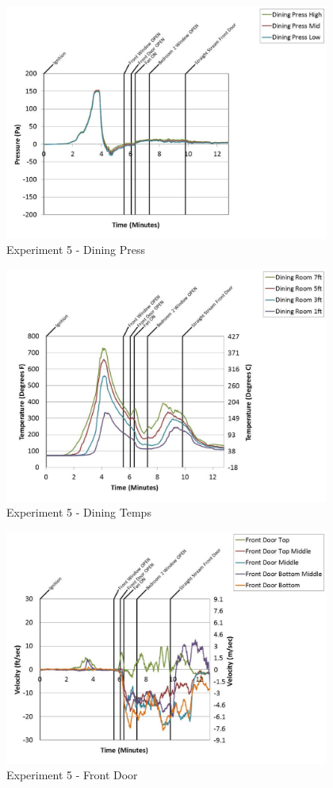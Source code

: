 \documentclass{article}
\begin{document}
\begin{appendices}
	\clearpage

	\begin{figure}[h!]
		\centering
		\includegraphics[height=3.05in]{0_Images/Results_Charts/Exp_5_Charts/DiningPress.pdf}
		\caption{Experiment 5 - Dining Press}
	\end{figure}
 

	\begin{figure}[h!]
		\centering
		\includegraphics[height=3.05in]{0_Images/Results_Charts/Exp_5_Charts/DiningTemps.pdf}
		\caption{Experiment 5 - Dining Temps}
	\end{figure}
 
	\clearpage

	\begin{figure}[h!]
		\centering
		\includegraphics[height=3.05in]{0_Images/Results_Charts/Exp_5_Charts/FrontDoor.pdf}
		\caption{Experiment 5 - Front Door}
	\end{figure}
 


\end{appendices}
\end{document}
